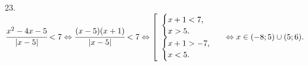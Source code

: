 23. $\cfrac{x^2-4x-5}{|x-5|}<7\Leftrightarrow\cfrac{(x-5)(x+1)}{|x-5|}<7\Leftrightarrow \left[\begin{array}{l} \begin{cases}x+1<7,\\ x>5.\end{cases}\\
\begin{cases}x+1>-7,\\ x<5.\end{cases}\end{array}\right.\Leftrightarrow  x\in (-8;5)\cup(5;6).$\\
